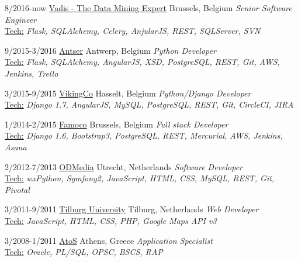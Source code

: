 \documentclass[]{friggeri-cv} %
\begin{document}
\begin{entrylist}

\entry
{8/2016-now}
{\href{http://www.vadis.com}{Vadis - The Data Mining Expert}}
{Brussels, Belgium}
{\emph{Senior Software Engineer} \\
\ul{Tech:} \emph{Flask, SQLAlchemy, Celery, AnjularJS, REST, SQLServer, SVN}
}


\entry
{9/2015-3/2016}
{\href{http://antser.be}{Antser}}
{Antwerp, Belgium}
{\emph {Python Developer} \\
\ul{Tech:} \emph{Flask, SQLAlchemy, AngularJS, XSD, PostgreSQL, REST, Git, AWS, Jenkins, Trello}
}

\entry
{3/2015-9/2015}
{\href{http://vikingco.com}{VikingCo}}
{Hasselt, Belgium}
{\emph {Python/Django Developer} \\
\ul{Tech:} \emph{Django 1.7, AngularJS, MySQL, PostgreSQL, REST, Git, CircleCI, JIRA}
}

\entry
{1/2014-2/2015}
{\href{http://famoco.com}{Famoco}}
{Brussels, Belgium}
{\emph {Full stack Developer} \\
\ul{Tech:} \emph{Django 1.6, Bootstrap3, PostgreSQL, REST, Mercurial, AWS, Jenkins, Asana}
}

\end{entrylist}
\begin{entrylist}
\entry
{2/2012-7/2013}
{\href{http://odmedia.nl}{ODMedia}}
{Utrecht, Netherlands}
{\emph {Software Developer} \\
\ul{Tech:} \emph{wxPython, Symfony2, JavaScript, HTML, CSS, MySQL, REST, Git, Pivotal}
}

\entry
{3/2011-9/2011}
{\href{https://www.tilburguniversity.edu}{Tilburg University}}
{Tilburg, Netherlands}
{\emph {Web Developer} \\
\ul{Tech:} \emph{JavaScript, HTML, CSS, PHP, Google Maps API v3}
}


\entry
{3/2008-1/2011}
{\href{http://atos.net/en-us/home.html}{AtoS}}
{Athens, Greece}
{\emph {Application Specialist}\\
\ul{Tech:} \emph{Oracle, PL/SQL, OPSC, BSCS, RAP} \\
}

\end{entrylist}


\end{document}
